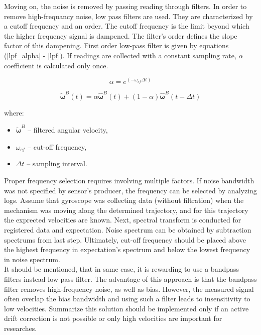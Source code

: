 Moving on, the noise is removed by passing reading through filters. In order to remove high-frequancy noise, low pass filters are used. They are characterized by a cutoff frequency and an order. The cutoff frequency is the limit beyond which the higher frequency signal is dampened. The filter's order defines the slope factor of this dampening. First order low-pass filter is given by equations (\ref{lpf_alpha} - \ref{lpf}). If readings are collected with a constant sampling rate, $\alpha$ coefficient is calculated only once.

\begin{equation}
	 \alpha = e^{\left( - \omega_{cf} \Delta t \right)}
	\label{lpf_alpha}
\end{equation}

\begin{equation}
	\bm{\tilde{\omega}}^B(t) = \alpha  \bm{\hat{\omega}}^B(t) + \left( 1 - \alpha \right) \bm{\hat{\omega}}^B(t - \Delta t)
	\label{lpf}
\end{equation}

where:
\begin{itemize}
	\item $\bm{\tilde{\omega}}^B$ -- filtered angular velocity,
	\item $\omega_{cf}$ -- cut-off frequency,
	\item $\Delta t$ -- sampling interval.
\end{itemize}

Proper frequency selection requires involving multiple factors. If noise bandwidth was not specified by sensor's producer, the frequency can be selected by analyzing logs. Assume that gyroscope was collecting data (without filtration) when the mechanism was moving along the determined trajectory, and for this trajectory the exprected velocities are known. Next, spectral transform is conducted for registered data and expectation. Noise spectrum can be obtained by subtraction spectrums from last step. Ultimately, cut-off frequency should be placed above the highest frequency in expectation's spectrum and below the lowest frequency in noise spectrum.\\

It should be mentioned, that in same case, it is rewarding to use a bandpass filters instead low-pass filter. The advantage of this approach is that the bandpass filter removes high-frequency noise, as well as bias. However, the measured signal often overlap the bias bandwidth and using such a filter leads to insensitivity to low velocities. Summarize this solution should be implemented only if an active drift correction is not possible or only high velocities are important for researches.


